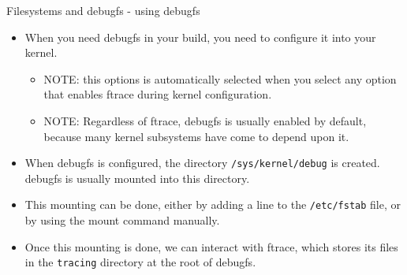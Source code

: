 \documentclass{beamer}
\begin{document}
\begin{frame}{Filesystems and debugfs - using debugfs}
  \begin{itemize}
  \item When you need debugfs in your build, you need to configure it
    into your kernel. %
    \begin{itemize}
    \item NOTE: this options is automatically selected when you select
      any option that enables ftrace during kernel configuration. %
    \item NOTE: Regardless of ftrace, debugfs is usually enabled by
      default, because many kernel subsystems have come to depend upon
      it. %
    \end{itemize}
  \item When debugfs is configured, the directory
    \texttt{/sys/kernel/debug} is created. debugfs is usually mounted
    into this directory.
  \item This mounting can be done, either by adding a line to the
    \texttt{/etc/fstab} file, or by using the mount command manually.
  \item Once this mounting is done, we can interact with ftrace, which
    stores its files in the \texttt{tracing} directory at the root of
    debugfs.
  \end{itemize}
\end{frame}
\end{document}
